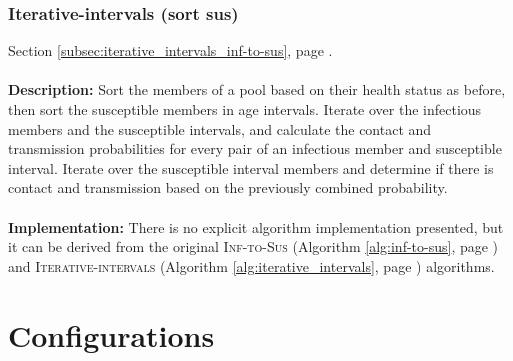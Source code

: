 \begin{appendices}
\subsection{Iterative-intervals (sort sus)}
Section \ref{subsec:iterative_intervals_inf-to-sus}, page \pageref{subsec:iterative_intervals_inf-to-sus}.
\\\\
\textbf{Description:} Sort the members of a pool based on their health status as before, then sort the susceptible members in age intervals. Iterate over the infectious members and the susceptible intervals, and calculate the contact and transmission probabilities for every pair of an infectious member and susceptible interval. Iterate over the susceptible interval members and determine if there is contact and transmission based on the previously combined probability.
\\\\
\textbf{Implementation:} There is no explicit algorithm implementation presented, but it can be derived from the original \textsc{Inf-to-Sus} (Algorithm \ref{alg:inf-to-sus}, page \pageref{alg:inf-to-sus}) and \textsc{Iterative-intervals} (Algorithm \ref{alg:iterative_intervals}, page \pageref{alg:iterative_intervals}) algorithms.

\chapter{Configurations}
\label{appendix:configurations}


\end{appendices}
